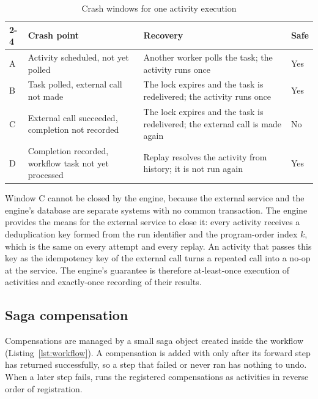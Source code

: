 \begin{table}[htbp]
  \centering
  \caption{Crash windows for one activity execution}
  \label{tab:crashwindows}
  \small
  \begin{tabular}{|p{0.2in}|p{1.75in}|p{2.45in}|p{0.6in}|}
    \cline{2-4}
    & \textbf{Crash point} & \textbf{Recovery} & \textbf{Safe} \\
    \hline
    A & Activity scheduled, not yet polled & Another worker polls the task;
      the activity runs once & Yes \\
    \hline
    B & Task polled, external call not made & The lock expires and the task is
      redelivered; the activity runs once & Yes \\
    \hline
    C & External call succeeded, completion not recorded & The lock expires
      and the task is redelivered; the external call is made again & No \\
    \hline
    D & Completion recorded, workflow task not yet processed & Replay resolves
      the activity from history; it is not run again & Yes \\
    \hline
  \end{tabular}
\end{table}

Window C cannot be closed by the engine, because the external service and the
engine's database are separate systems with no common transaction. The engine
provides the means for the external service to close it: every activity
receives a deduplication key formed from the run identifier and the
program-order index $k$, which is the same on every attempt and every replay.
An activity that passes this key as the idempotency key of the external call
turns a repeated call into a no-op at the service. The engine's guarantee is
therefore at-least-once execution of activities and exactly-once recording of
their results.

\subsection{Saga compensation}

Compensations are managed by a small saga object created inside the workflow
(Listing~\ref{lst:workflow}). A compensation is added with
 only after its forward step has returned successfully, so
a step that failed or never ran has nothing to undo. When a later step fails,
 runs the registered compensations as activities in reverse
order of registration.


